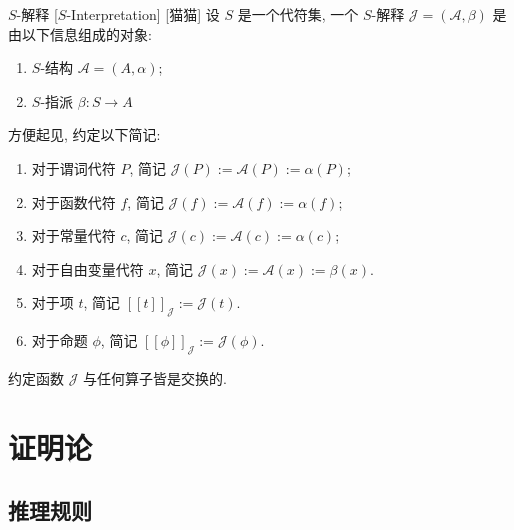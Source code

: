 \documentclass[UTF8]{ctexart}
\newcommand{\assign}[2]{\ensuremath{{[\![#1]\!]}_{#2}}}
\begin{document}
            \begin{dfn}
                []
                {\(S\)-解释}
                [\(S\)-Interpretation]
                [猫猫]
                设 \(S\) 是一个代符集, 一个 \(S\)-解释 \(\mathcal{J}=(\mathcal{A},\beta)\) 是由以下信息组成的对象: 
                \begin{enumerate}
                    \item \(S\)-结构 \(\mathcal{A}=(A,\alpha)\); 
                    \item \(S\)-指派 \(\beta:S\to A\)
                \end{enumerate}

                方便起见, 约定以下简记: 
                \begin{enumerate}
                    \item 对于谓词代符 \(P\), 简记 \(\mathcal{J}(P):=\mathcal{A}(P):=\alpha(P)\); 
                    \item 对于函数代符 \(f\), 简记 \(\mathcal{J}(f):=\mathcal{A}(f):=\alpha(f)\); 
                    \item 对于常量代符 \(c\), 简记 \(\mathcal{J}(c):=\mathcal{A}(c):=\alpha(c)\); 
                    \item 对于自由变量代符 \(x\), 简记 \(\mathcal{J}(x):=\mathcal{A}(x):=\beta(x)\). 
                    \item 对于项 \(t\), 简记 \(\assign{t}{\mathcal{J}}:=\mathcal{J}(t)\). 
                    \item 对于命题 \(\phi\), 简记 \(\assign{\phi}{\mathcal{J}}:=\mathcal{J}(\phi)\). 
                \end{enumerate}

                约定函数 \(\mathcal{J}\) 与任何算子皆是交换的. 
            \end{dfn}

    \section{证明论}
        
        \subsection{推理规则}
            
\end{document}

